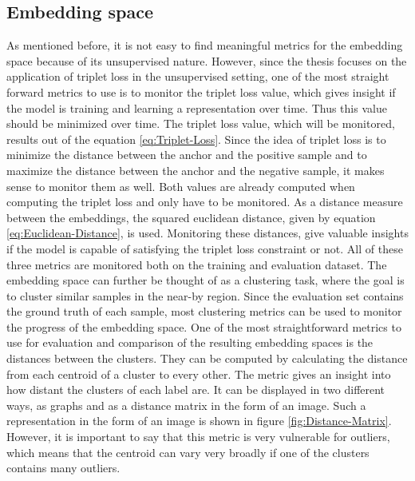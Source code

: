 \subsection{Embedding space}
\label{sub:Metrics-Embedding-Space}
As mentioned before, it is not easy to find meaningful metrics for the embedding space because of its unsupervised nature. However, since the thesis focuses on the application of triplet loss in the unsupervised setting, one of the most straight forward metrics to use is to monitor the triplet loss value, which gives insight if the model is training and learning a representation over time. Thus this value should be minimized over time. The triplet loss value, which will be monitored, results out of the equation \ref{eq:Triplet-Loss}. Since the idea of triplet loss is to minimize the distance between the anchor and the positive sample and to maximize the distance between the anchor and the negative sample, it makes sense to monitor them as well. Both values are already computed when computing the triplet loss and only have to be monitored. As a distance measure between the embeddings, the squared euclidean distance, given by equation \ref{eq:Euclidean-Distance}, is used. Monitoring these distances, give valuable insights if the model is capable of satisfying the triplet loss constraint or not. All of these three metrics are monitored both on the training and evaluation dataset.
\newline
\newline
The embedding space can further be thought of as a clustering task, where the goal is to cluster similar samples in the near-by region. Since the evaluation set contains the ground truth of each sample, most clustering metrics can be used to monitor the progress of the embedding space. 
\newline
\newline
One of the most straightforward metrics to use for evaluation and comparison of the resulting embedding spaces is the distances between the clusters. They can be computed by calculating the distance from each centroid of a cluster to every other. The metric gives an insight into how distant the clusters of each label are. It can be displayed in two different ways, as graphs and as a distance matrix in the form of an image. Such a representation in the form of an image is shown in figure \ref{fig:Distance-Matrix}. However, it is important to say that this metric is very vulnerable for outliers, which means that the centroid can vary very broadly if one of the clusters contains many outliers.
